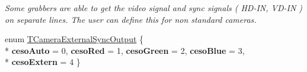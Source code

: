 \begin{DoxyCompactItemize}
\begin{DoxyCompactList}\small\item\em Some grabbers are able to get the video signal and sync signals ( H\+D-\/\+I\+N, V\+D-\/\+I\+N ) on separate lines. The user can define this for non standard cameras. \end{DoxyCompactList}\item 
\hypertarget{group___device_specific_interface_ga7e0cda0b45b6d0142d2560d276672edd}{enum \hyperlink{group___device_specific_interface_ga7e0cda0b45b6d0142d2560d276672edd}{T\+Camera\+External\+Sync\+Output} \{ \\*
{\bfseries ceso\+Auto} = 0, 
{\bfseries ceso\+Red} = 1, 
{\bfseries ceso\+Green} = 2, 
{\bfseries ceso\+Blue} = 3, 
\\*
{\bfseries ceso\+Extern} = 4
 \}}\label{group___device_specific_interface_ga7e0cda0b45b6d0142d2560d276672edd}


\end{DoxyCompactItemize}
